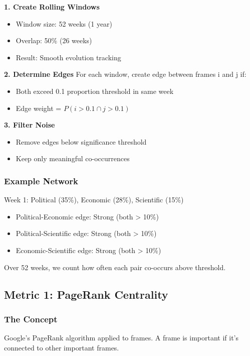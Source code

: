 \documentclass[11pt]{article}
\begin{document}
\begin{tcolorbox}[mybox={Network Construction Process}]
\textbf{1. Create Rolling Windows}
\begin{itemize}
    \item Window size: 52 weeks (1 year)
    \item Overlap: 50\% (26 weeks)
    \item Result: Smooth evolution tracking
\end{itemize}

\textbf{2. Determine Edges}
For each window, create edge between frames i and j if:
\begin{itemize}
    \item Both exceed 0.1 proportion threshold in same week
    \item Edge weight = $P(i > 0.1 \cap j > 0.1)$
\end{itemize}

\textbf{3. Filter Noise}
\begin{itemize}
    \item Remove edges below significance threshold
    \item Keep only meaningful co-occurrences
\end{itemize}
\end{tcolorbox}

\subsubsection{Example Network}

Week 1: Political (35\%), Economic (28\%), Scientific (15\%)
\begin{itemize}
    \item Political-Economic edge: Strong (both > 10\%)
    \item Political-Scientific edge: Strong (both > 10\%)
    \item Economic-Scientific edge: Strong (both > 10\%)
\end{itemize}

Over 52 weeks, we count how often each pair co-occurs above threshold.

\subsection{Metric 1: PageRank Centrality}

\subsubsection{The Concept}
Google's PageRank algorithm applied to frames. A frame is important if it's connected to other important frames.
\end{document}
